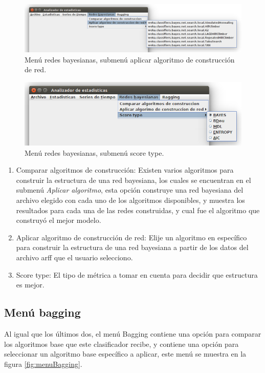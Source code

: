 \begin{figure}[h]%
	\centering
	\includegraphics[width=14cm]{img/menuRedBayesianaAlgo.png}
	\caption{Menú redes bayesianas, submenú aplicar algoritmo de construcción de red.}
	\label{fig:menuRedesBayesianasAlgoritmo}
\end{figure}

\begin{figure}[h]%
	\centering
	\includegraphics[width=14cm]{img/menuredBayesianaScore.png}
	\caption{Menú redes bayesianas, submenú score type.}
	\label{fig:menuRedesBayesianasScore}
\end{figure}
\renewcommand{\labelenumi}{$\bullet$ }
\begin{enumerate}
	\item Comparar algoritmos de construcción: Existen varios algoritmos para construir la estructura de una red bayesiana, los cuales se encuentran en el submenú \textit{Aplicar algoritmo}, esta opción construye una red bayesiana del archivo elegido con cada uno de los algoritmos disponibles, y muestra los resultados para cada una de las redes construidas, y cual fue el algoritmo que construyó el mejor modelo.
	\item Aplicar algoritmo de construcción de red: Elije un algoritmo en específico para construir la estructura de una red bayesiana a partir de los datos del archivo arff que el usuario selecciono.
	\item Score type: El tipo de métrica a tomar en cuenta para decidir que estructura es mejor.
\end{enumerate}

\subsection{Menú bagging} \label{subsec:menuBagging}
Al igual que los últimos dos, el menú Bagging contiene una opción para comparar los algoritmos base que este clasificador recibe, y contiene una opción para seleccionar un algoritmo base específico a aplicar, este menú se muestra en la figura \ref{fig:menuBagging}.

